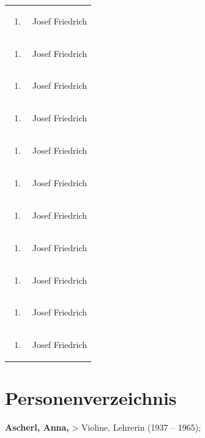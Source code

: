 \documentclass[a4paper]{article}
\begin{document}
\begin{flushleft}
\begin{supertabular}{m{1.2409999cm}m{14.604cm}}
\begin{enumerate}
\item
\end{enumerate}
 &
Josef Friedrich\\
\begin{enumerate}
\item
\end{enumerate}
 &
Josef Friedrich\\
\begin{enumerate}
\item
\end{enumerate}
 &
Josef Friedrich\\
\begin{enumerate}
\item
\end{enumerate}
 &
Josef Friedrich\\
\begin{enumerate}
\item
\end{enumerate}
 &
Josef Friedrich\\
\begin{enumerate}
\item
\end{enumerate}
 &
Josef Friedrich\\
\begin{enumerate}
\item
\end{enumerate}
 &
Josef Friedrich\\
\begin{enumerate}
\item
\end{enumerate}
 &
Josef Friedrich\\
\begin{enumerate}
\item
\end{enumerate}
 &
Josef Friedrich\\
\begin{enumerate}
\item
\end{enumerate}
 &
Josef Friedrich\\
\begin{enumerate}
\item
\end{enumerate}
 &
Josef Friedrich\\
\end{supertabular}
\end{flushleft}
\section{Personenverzeichnis}
\hypertarget{RefHeadingToc100333759}{}\textbf{Ascherl, Anna,}
{\textgreater} Violine, Lehrerin (1937 – 1965);
\end{document}
